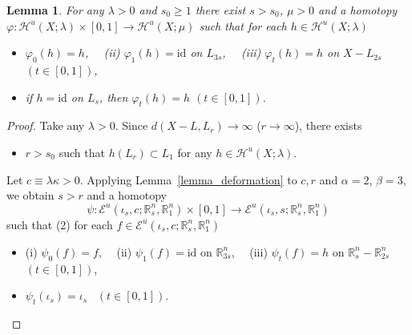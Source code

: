 \documentclass[11pt, fleqn]{amsart}
\newtheorem{lemma}{Lemma}[section]
\theoremstyle{definition}
\newcommand{\cal}{\mathcal}
\renewcommand{\phi}{\varphi}
\newcommand{\lra}{\longrightarrow}
\newcommand{\id}{\mathrm{id}}
\newcommand{\E}{\mathcal E}
\newcommand{\IR}{\mathbb R}
\begin{document}
\begin{lemma}\label{lemma_deform_homeo_1} 
For any $\lambda > 0$ and $s_0 \geq 1$ there exist $s > s_0$, $\mu > 0$ and 
a homotopy $\phi : {\cal H}^u(X; \lambda) \times [0,1] \lra {\cal H}^u(X; \mu)$
such that for each $h \in {\cal H}^u(X; \lambda)$
\begin{itemize}
\item[(i)\,] $\phi_0(h) = h$, \ \ {\rm (ii)} $\phi_1(h) = \id$ on $L_{3s}$, \ \ {\rm (iii)} $\phi_t(h) = h$ on $X - L_{2s}$ \ $(t \in [0,1])$,  
\item[(iv)] if $h = \id$ on $L_s$, then $\phi_t(h) = h$ $(t \in [0,1])$. 
\end{itemize} 
\end{lemma}

\begin{proof} Take any $\lambda > 0$. 
Since $d(X - L, L_r) \to \infty$ ($r \to \infty$), there exists 
\begin{itemize}
\item[(1)] $r > s_0$ such that $h(L_r) \subset L_1$ for any $h \in {\cal H}^u(X; \lambda)$. 
\end{itemize} 
Let $c \equiv \lambda \kappa > 0$. 
Applying Lemma~\ref{lemma_deformation} to $c, r$ and $\alpha=2$, $\beta=3$, 
we obtain $s > r$ and a homotopy 
$$\psi : \E^u(\iota_s, c; \IR^n_s, \IR^n_1) \times [0,1] \lra \E^u(\iota_s, s; \IR^n_s, \IR^n_1)$$ 
such that (2) for each $f \in \E^u(\iota_s, c; \IR^n_s, \IR^n_1)$ 
\begin{itemize}
\item[] \hspace{8mm} (i) $\psi_0(f) = f$, \ \ (ii) $\psi_1(f) = \id$ on $\IR^n_{3s}$, \ \ 
(iii) $\psi_t(f) = h$ on $\IR^n_s - \IR^n_{2s}$ \ $(t \in [0,1])$,  
\item[(3)] $\psi_t(\iota_s) = \iota_s$ \ $(t \in [0,1])$. 
\end{itemize} 


\end{proof}
\end{document}
